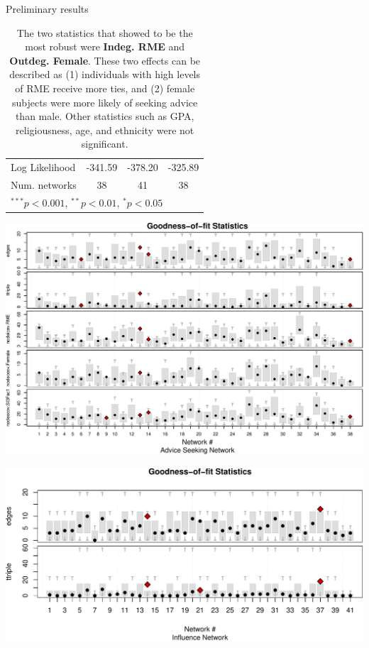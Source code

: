 \documentclass[10pt,ignorenonframetext,aspectratio=169,]{beamer}
\begin{document}
\begin{frame}{Preliminary results}
\begin{table}
\begin{center}
\begin{tabular}{l c c c }
Log Likelihood              & -341.59       & -378.20       & -325.89       \\
Num. networks               & 38            & 41            & 38            \\
\hline
\multicolumn{4}{l}{\scriptsize{$^{***}p<0.001$, $^{**}p<0.01$, $^*p<0.05$}}
\end{tabular}
\caption{The two statistics that showed to be the most robust were \textbf{Indeg. RME} and \textbf{Outdeg. Female}. These two effects can be described as (1) individuals with high levels of RME receive more ties, and (2) female subjects were more likely of seeking advice than male. Other statistics such as GPA, religiousness, age, and ethnicity were not significant.}
\label{table:coefficients}
\end{center}
\end{table}

\normalsize

\end{frame}

\begin{frame}

\scriptsize

\begin{center}\includegraphics[width=.75\linewidth]{index_files/figure-beamer/preliminary-results-gof-advice-1} \end{center}

\normalsize

\end{frame}

\begin{frame}

\scriptsize

\begin{center}\includegraphics[width=.75\linewidth]{index_files/figure-beamer/preliminary-results-gof-influence-1} \end{center}

\normalsize

\end{frame}
\end{document}
